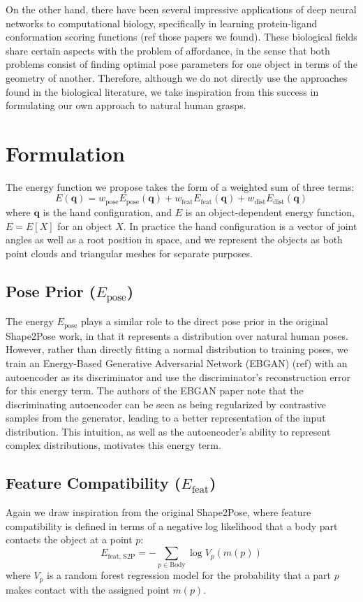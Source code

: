\documentclass[10pt,twocolumn,letterpaper]{article}
\def\q{\mathbf{q}}
\begin{document}
On the other hand, there have been several impressive applications of deep neural networks to computational biology, specifically in learning protein-ligand conformation scoring functions (ref those papers we found). These biological fields share certain aspects with the problem of affordance, in the sense that both problems consist of finding optimal pose parameters for one object in terms of the geometry of another. Therefore, although we do not directly use the approaches found in the biological literature, we take inspiration from this success in formulating our own approach to natural human grasps.

\section{Formulation}
The energy function we propose takes the form of a weighted sum of three terms:
\begin{equation}
E(\q) = w_{\text{pose}}E_{\text{pose}}(\q) + w_{\text{feat}}E_{\text{feat}}(\q)+ w_{\text{dist}}E_{\text{dist}}(\q)
\end{equation}
where $\q$ is the hand configuration, and $E$ is an object-dependent energy function, $E = E[X]$ for an object $X$. In practice the hand configuration is a vector of joint angles as well as a root position in space, and we represent the objects as both point clouds and triangular meshes for separate purposes.

\subsection{Pose Prior ($E_{\text{pose}}$)}
The energy $E_{\text{pose}}$ plays a similar role to the direct pose prior in the original Shape2Pose work, in that it represents a distribution over natural human poses. However, rather than directly fitting a normal distribution to training poses, we train an Energy-Based Generative Adversarial Network (EBGAN) (ref) with an autoencoder as its discriminator and use the discriminator's reconstruction error for this energy term. The authors of the EBGAN paper note that the discriminating autoencoder can be seen as being regularized by contrastive samples from the generator, leading to a better representation of the input distribution. This intuition, as well as the autoencoder's ability to represent complex distributions, motivates this energy term.

\subsection{Feature Compatibility ($E_{\text{feat}}$)}
Again we draw inspiration from the original Shape2Pose, where feature compatibility is defined in terms of a negative log likelihood that a body part contacts the object at a point $p$:
\begin{equation}
	E_{\text{feat, S2P}} = -\sum_{p \in \text{Body}} \log V_p(m(p))
\end{equation}
where $V_p$ is a random forest regression model for the probability that a part $p$ makes contact with the assigned point $m(p)$. 
\end{document}

